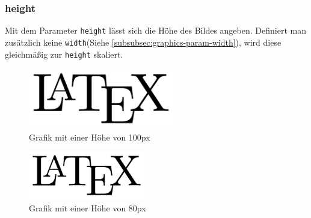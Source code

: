 \documentclass[
12pt,
ngerman
]{scrreprt}
\begin{document}
\subsubsection{height}
\label{subsubsec:graphics-param-height}
Mit dem Parameter \verb!height! lässt sich die Höhe des Bildes angeben. Definiert man zusätzlich keine \verb!width!(Siehe \vref{subsubsec:graphics-param-width}), wird diese gleichmäßig zur \verb!height! skaliert.
\begin{figure} [hbt!]
  \centering
  \includegraphics[height=100px]{img/latex-logo}
  \caption{Grafik mit einer Höhe von 100px}
  \label{fig:graphics-param-height-1}
\end{figure}
\begin{figure} [hbt!]
  \centering
  \includegraphics[height=80px]{img/latex-logo}
  \caption{Grafik mit einer Höhe von 80px}
  \label{fig:graphics-param-height-2}
\end{figure}
\end{document}
